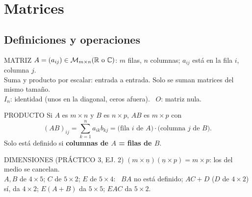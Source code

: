 \chapter{Matrices}

\section{Definiciones y operaciones}
\begin{sello}{MATRIZ}
$A=(a_{ij})\in\mathcal{M}_{m\times n}(\mathbb{R}\text{ o }\mathbb{C})$: $m$ filas, $n$ columnas; $a_{ij}$ está en la fila $i$, columna $j$.\\[2pt]
Suma y producto por escalar: entrada a entrada. Solo se suman matrices del mismo tamaño.\\[2pt]
$I_n$: identidad (unos en la diagonal, ceros afuera). \ $O$: matriz nula.
\end{sello}
\begin{sello}{PRODUCTO}
Si $A$ es $m\times n$ y $B$ es $n\times p$, $AB$ es $m\times p$ con
\[(AB)_{ij}=\sum_{k=1}^n a_{ik}b_{kj}=\text{(fila $i$ de $A$)}\cdot\text{(columna $j$ de $B$)}.\]
Solo está definido si \textbf{columnas de $A$ = filas de $B$}.
\end{sello}
\begin{memo}{DIMENSIONES (PRÁCTICO 3, EJ. 2)}
$(m\times\underline{n})(\underline{n}\times p)=m\times p$: los del medio se cancelan.\\
$A,B$ de $4\times5$; $C$ de $5\times2$; $E$ de $5\times4$: \ $BA$ no está definido; $AC+D$ ($D$ de $4\times2$) sí, da $4\times2$; $E(A+B)$ da $5\times5$; $EAC$ da $5\times2$.
\end{memo}

